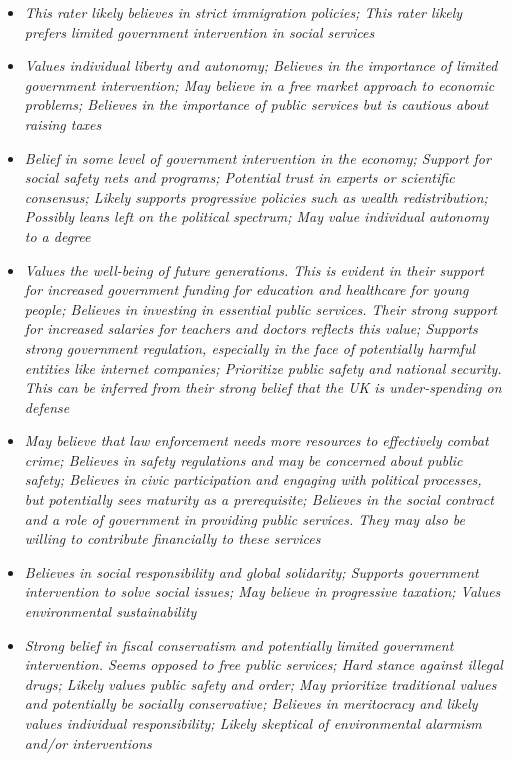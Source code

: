 \documentclass[11pt]{article}
\newcommand{\profiletext}[1]{\textit{#1}}
\begin{document}
\begin{itemize}
\item \profiletext{This rater likely believes in strict immigration policies; This rater likely prefers limited government intervention in social services}
\item \profiletext{Values individual liberty and autonomy; Believes in the importance of limited government intervention; May believe in a free market approach to economic problems; Believes in the importance of public services but is cautious about raising taxes}
\item \profiletext{Belief in some level of government intervention in the economy; Support for social safety nets and programs; Potential trust in experts or scientific consensus; Likely supports progressive policies such as wealth redistribution; Possibly leans left on the political spectrum; May value individual autonomy to a degree}
\item \profiletext{Values the well-being of future generations. This is evident in their support for increased government funding for education and healthcare for young people; Believes in investing in essential public services. Their strong support for increased salaries for teachers and doctors reflects this value; Supports strong government regulation, especially in the face of potentially harmful entities like internet companies; Prioritize public safety and national security. This can be inferred from their strong belief that the UK is under-spending on defense}
\item \profiletext{May believe that law enforcement needs more resources to effectively combat crime; Believes in safety regulations and may be concerned about public safety; Believes in civic participation and engaging with political processes, but potentially sees maturity as a prerequisite; Believes in the social contract and a role of government in providing public services. They may also be willing to contribute financially to these services}
\item \profiletext{Believes in social responsibility and global solidarity; Supports government intervention to solve social issues; May believe in progressive taxation; Values environmental sustainability}
\item \profiletext{Strong belief in fiscal conservatism and potentially limited government intervention. Seems opposed to free public services; Hard stance against illegal drugs; Likely values public safety and order; May prioritize traditional values and potentially be socially conservative; Believes in meritocracy and likely values individual responsibility; Likely skeptical of environmental alarmism and/or interventions}

\end{itemize}
\end{document}
